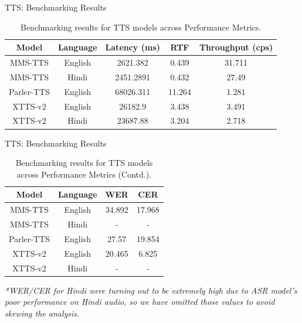 \documentclass{beamer}
\begin{document}
\begin{frame}{TTS: Benchmarking Results}
    \begin{table}[]
    \centering
    \begin{tabular}{c|c|c|c|c}
        \textbf{Model} & \textbf{Language} & \textbf{Latency (ms)} & \textbf{RTF} & \textbf{Throughput (cps)} \\
        \hline
        MMS-TTS & English & 2621.382 & 0.439 & 31.711 \\
        MMS-TTS & Hindi & 2451.2891 & 0.432 & 27.49 \\
        Parler-TTS & English & 68026.311 & 11.264 & 1.281 \\
        XTTS-v2 & English & 26182.9 & 3.438 & 3.491 \\
        XTTS-v2 & Hindi & 23687.88 & 3.204 & 2.718 \\
    \end{tabular}
    \caption{Benchmarking results for TTS models across Performance Metrics.}
    \end{table}

\end{frame}

\begin{frame}{TTS: Benchmarking Results}
    \begin{table}[]
    \centering
    \begin{tabular}{c|c|c|c}
        \textbf{Model} & \textbf{Language} & \textbf{WER} & \textbf{CER} \\
        \hline
        MMS-TTS & English & 34.892 & 17.968\\
        MMS-TTS & Hindi & - & -\\
        Parler-TTS & English & 27.57 & 19.854\\
        XTTS-v2 & English & 20.465 & 6.825\\
        XTTS-v2 & Hindi & - & -\\    
    \end{tabular}
    \caption{Benchmarking results for TTS models across Performance Metrics (Contd.).}
    \end{table}

    \footnotesize{\textit{*WER/CER for Hindi were turning out to be extremely high due to ASR model's poor performance on Hindi audio, so we have omitted those values to avoid skewing the analysis.}}
\end{frame}
\end{document}
